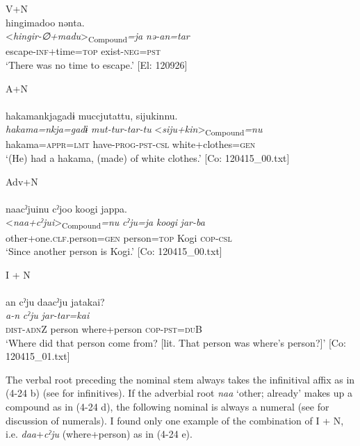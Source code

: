 \ex  V+N\\
\glll    hingimadoo  nənta.\\
      <\textit{hingir-∅+madu}>\textsubscript{Compound}\textit{=ja}  \textit{nə-an=tar}\\
      escape-\textsc{inf}+time=\textsc{top}  exist-\textsc{neg}=\textsc{pst}\\
      \glt       ‘There was no time to escape.’ [El: 120926]

\ex A+N\\\\
\glll   hakamankjagadɨ  muccjutattu,  sijukinnu.\\
      \textit{hakama=nkja=gadɨ}  \textit{mut-tur-tar-tu}  <\textit{siju+kin}>\textsubscript{Compound}\textit{=nu}\\
      hakama=\textsc{appr}=\textsc{lmt}  have-\textsc{prog}-\textsc{pst}-\textsc{csl}  white+clothes=\textsc{gen}\\
      \glt       ‘(He) had a hakama, (made) of white clothes.’ [Co: 120415\_00.txt]

\ex Adv+N\\\\
\glll     naacˀjuinu  cˀjoo  koogi  jappa.\\
      <\textit{naa+cˀjui}>\textsubscript{Compound}\textit{=nu}  \textit{cˀju=ja}  \textit{koogi}  \textit{jar-ba}\\
      other+one.\textsc{clf}.person=\textsc{gen}  person=\textsc{top}  Kogi  \textsc{cop}-\textsc{csl}\\
      \glt       ‘Since another person is Kogi.’ [Co: 120415\_00.txt]

\ex I + N\\\\
\glll      an  cˀju  daacˀju  jatakai?\\
      \textit{a-n}  \textit{cˀju}  \textit{}  \textit{jar-tar=kai}\\
      \textsc{dist}-\textsc{adn}Z  person  where+person  \textsc{cop}-\textsc{pst}=\textsc{du}B\\
      \glt       ‘Where did that person come from? [lit. That person was where’s person?]’ [Co: 120415\_01.txt]
    \z
\z

The verbal root preceding the nominal stem always takes the infinitival affix as in (4-24 b) (see  for infinitives). If the adverbial root \textit{naa} ‘other; already’ makes up a compound as in (4-24 d), the following nominal is always a numeral (see  for discussion of numerals). I found only one example of the combination of I + N, i.e. \textit{daa}+\textit{cˀju} (where+person) as in (4-24 e).

